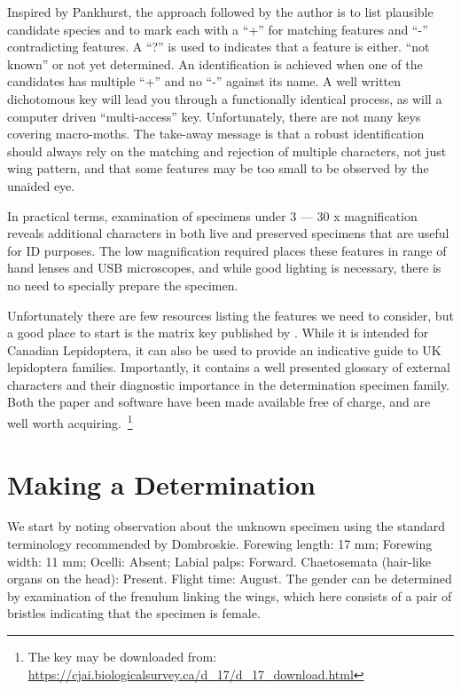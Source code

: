 \documentclass[]{article}
\begin{document}
 Inspired by Pankhurst, the approach followed by the author is to list plausible candidate species and to mark each with a \enquote{+} for matching features and \enquote{-} contradicting features. A \enquote{?} is used to  indicates that a feature is either. \enquote{not known} or not yet determined. An identification is achieved when one of the candidates has multiple \enquote{+} and no \enquote{-} against its name.
 A well written dichotomous key will lead you through a functionally identical process, as will a computer driven \enquote{multi-access} key. Unfortunately, there are not many keys covering macro-moths.
 The take-away message is that a robust identification should always rely on the matching and rejection of multiple characters, not just wing pattern, and that some features  may be too small to be observed by the unaided eye.  
 
 In practical terms,  examination of specimens under  3 --- 30 x magnification reveals additional characters  in both live and preserved specimens that are useful for ID purposes. The low magnification required places these features in range of hand lenses and USB microscopes, and while good lighting is necessary, there is no need to specially prepare the specimen.
 
 Unfortunately there are few resources listing the features we need to consider, but a good place to start is the matrix key published by \cite{Dombroskie2011}. While it is intended for Canadian Lepidoptera, it can also be used to provide an indicative guide to UK lepidoptera families. Importantly, it contains a well presented glossary of external characters and their diagnostic importance in the determination specimen family. Both the paper and software have been made available free of charge, and are well worth acquiring.~\footnote{ The key may be downloaded from: \url{https://cjai.biologicalsurvey.ca/d_17/d_17_download.html}}
 
\section*{Making a Determination}
We start by noting observation about the unknown specimen using the standard terminology recommended by Dombroskie.
Forewing length: 17 mm; Forewing width: 11 mm;  Ocelli: Absent;  Labial palps: Forward. Chaetosemata (hair-like organs on the head):  Present. Flight time: August. The gender can be determined by examination of the frenulum linking the wings, which here consists of a pair of bristles indicating that the specimen is female.
\end{document}
